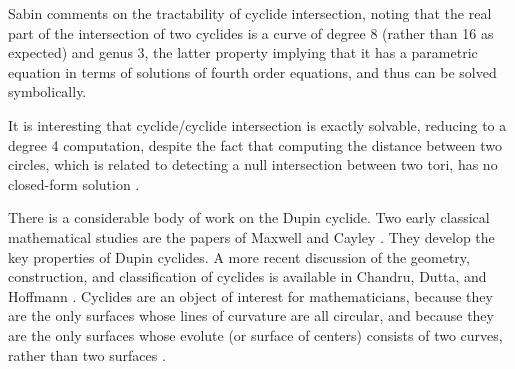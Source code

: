 




\begin{rmk}
Sabin \cite{Sabin89} comments on the tractability of cyclide intersection,
noting that the real part of the intersection of two cyclides is a curve 
of degree 8 (rather than 16 as expected) and genus 3, 
the latter property implying that it has a 
parametric equation in terms of solutions of fourth order equations, 
and thus can be solved symbolically.

It is interesting that cyclide/cyclide intersection is exactly
solvable, reducing to a degree 4 computation, despite the fact that
computing the distance between two circles, which is related to 
detecting a null intersection between two tori, has no closed-form
solution \cite{neff90}.
\end{rmk}


There is a considerable body of work on the Dupin cyclide.
Two early classical mathematical studies are the papers 
of Maxwell \cite{MAX68} and Cayley \cite{CAY96}.
They develop the key properties of Dupin cyclides.
%
A more recent discussion of the 
geometry, construction, and classification of cyclides is
available in Chandru, Dutta, and Hoffmann \cite{CDH89a}.
Cyclides are an object of interest for mathematicians,
because they are the only surfaces whose lines of curvature are all circular,
and because they are the only surfaces whose evolute (or surface of centers)
consists of two curves, rather than two surfaces \cite{H52}.

